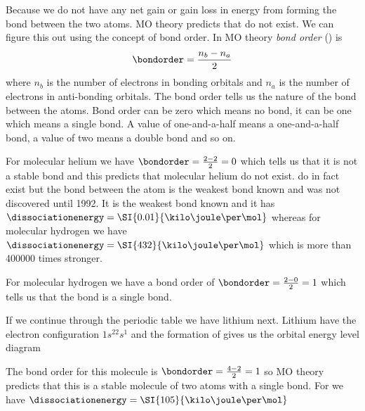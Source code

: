 \documentclass[../mit-general-chemistry.tex]{subfiles}
\begin{document}
Because we do not have any net gain or gain loss in energy from
forming the bond between the two atoms. MO theory predicts that
 do not exist. We can figure this out using the concept of
bond order. In MO theory {\em bond order} (\bondorder) is
\begin{equation*}
  \bondorder = \frac{n_b - n_{a}}{2}
\end{equation*}
where $n_b$ is the number of electrons in bonding orbitals and $n_{a}$
is the number of electrons in anti-bonding orbitals. The bond order
tells us the nature of the bond between the atoms. Bond order can be zero
which means no bond, it can be one which means a single bond. A value
of one-and-a-half means a one-and-a-half bond, a value of two means a
double bond and so on.

For molecular helium we have $\bondorder = \frac{2 - 2}{2} = 0$ which
tells us that it is not a stable bond and this predicts that molecular
helium do not exist.  do in fact exist but the bond between
the atom is the weakest bond known and was not discovered until
1992. It is the weakest bond known and it has $\dissociationenergy =
\SI{0.01}{\kilo\joule\per\mol}$ whereas for molecular hydrogen we have
$\dissociationenergy = \SI{432}{\kilo\joule\per\mol}$ which is more
than \num{400000} times stronger.

For molecular hydrogen we have a bond order of $\bondorder = \frac{2 -
  0}{2} = 1$ which tells us that the  bond is a single
bond.



If we continue through the periodic table we have lithium
next. Lithium have the electron configuration $1s^22s^1$ and the
formation of 
gives us the orbital energy level diagram

\begin{center}
  \begin{MOdiagram}[names,labels,labels-fs=\footnotesize]
    \EnergyAxis[title=$E$]
  \end{MOdiagram}
\end{center}

The bond order for this molecule is $\bondorder = \frac{4 - 2}{2} = 1$
so MO theory predicts that this is a stable molecule of two atoms with
a single bond. For  we have $\dissociationenergy =
\SI{105}{\kilo\joule\per\mol}$
\end{document}
